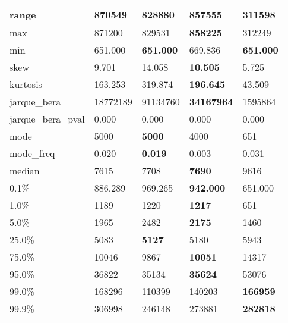 \begin{table}[H]
\begin{tabular}{|l|m{10em}|m{10em}|m{10em}|m{10em}|}
\hline range & 870549 & 828880 & \bfseries 857555 & \cellcolor[rgb]{0.9, 0.54, 0.52} 311598 \\
\hline max & 871200 & 829531 & \bfseries 858225 & \cellcolor[rgb]{0.9, 0.54, 0.52} 312249 \\
\hline min & 651.000 & \bfseries 651.000 & \cellcolor[rgb]{0.9, 0.54, 0.52} 669.836 & \bfseries 651.000 \\
\hline skew & 9.701 & \cellcolor[rgb]{0.9, 0.54, 0.52} 14.058 & \bfseries 10.505 & 5.725 \\
\hline kurtosis & 163.253 & \cellcolor[rgb]{0.9, 0.54, 0.52} 319.874 & \bfseries 196.645 & 43.509 \\
\hline jarque\_bera & 18772189 & \cellcolor[rgb]{0.9, 0.54, 0.52} 91134760 & \bfseries 34167964 & 1595864 \\
\hline jarque\_bera\_pval & 0.000 & 0.000 & 0.000 & 0.000 \\
\hline mode & 5000 & \bfseries 5000 & 4000 & \cellcolor[rgb]{0.9, 0.54, 0.52} 651 \\
\hline mode\_freq & 0.020 & \bfseries 0.019 & \cellcolor[rgb]{0.9, 0.54, 0.52} 0.003 & 0.031 \\
\hline median & 7615 & 7708 & \bfseries 7690 & \cellcolor[rgb]{0.9, 0.54, 0.52} 9616 \\
\hline 0.1\% & 886.289 & 969.265 & \bfseries 942.000 & \cellcolor[rgb]{0.9, 0.54, 0.52} 651.000 \\
\hline 1.0\% & 1189 & 1220 & \bfseries 1217 & \cellcolor[rgb]{0.9, 0.54, 0.52} 651 \\
\hline 5.0\% & 1965 & \cellcolor[rgb]{0.9, 0.54, 0.52} 2482 & \bfseries 2175 & 1460 \\
\hline 25.0\% & 5083 & \bfseries 5127 & 5180 & \cellcolor[rgb]{0.9, 0.54, 0.52} 5943 \\
\hline 75.0\% & 10046 & 9867 & \bfseries 10051 & \cellcolor[rgb]{0.9, 0.54, 0.52} 14317 \\
\hline 95.0\% & 36822 & 35134 & \bfseries 35624 & \cellcolor[rgb]{0.9, 0.54, 0.52} 53076 \\
\hline 99.0\% & 168296 & \cellcolor[rgb]{0.9, 0.54, 0.52} 110399 & 140203 & \bfseries 166959 \\
\hline 99.9\% & 306998 & \cellcolor[rgb]{0.9, 0.54, 0.52} 246148 & 273881 & \bfseries 282818 \\
\hline
\end{tabular}
\end{table}
